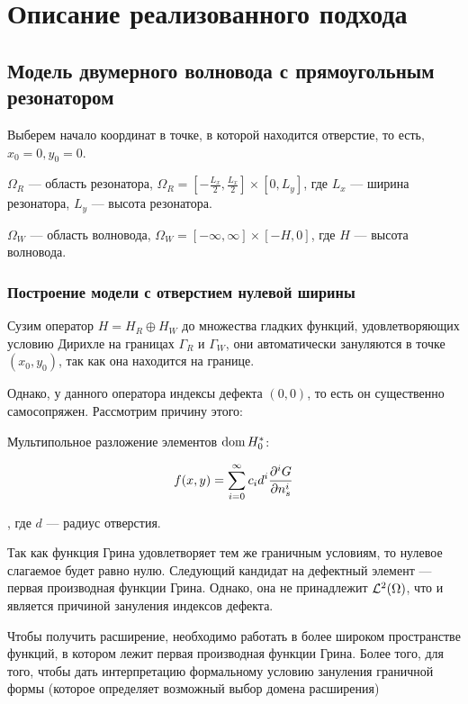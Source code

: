\chapter{Описание реализованного подхода}
\label{chapter2}

\section{Модель двумерного волновода с прямоугольным резонатором}


Выберем начало координат в точке, в которой находится отверстие, то есть, $x_0 = 0, y_0 = 0$.

$\Omega_R$ — область резонатора, $\Omega_R = [- \frac{L_x}{2}, \frac{L_x}{2}] \times [0, L_y]$, где $L_x$ — ширина резонатора, $L_y$ — высота резонатора.

$\Omega_W$ — область волновода, $\Omega_W = [-\infty, \infty] \times [-H, 0]$, где $H$ — высота волновода.

\subsection{Построение модели с отверстием нулевой ширины}
Сузим оператор $H = H_R \oplus H_W$ до множества гладких функций, удовлетворяющих условию Дирихле на границах $\Gamma_R$ и $\Gamma_W$, они автоматически зануляются в точке $(x_0, y_0)$, так как она находится на границе.

Однако, у данного оператора индексы дефекта $(0, 0)$, то есть он существенно самосопряжен. Рассмотрим причину этого:


Мультипольное разложение элементов $\operatorname{dom} H_0^*$:

\[
f(x, y) = \sum\limits_{i = 0}^\infty c_i d^i \pdv[i]{G}{n_s} (x, y, x_0, y_0; E_0)
\]

, где $d$ — радиус отверстия.

Так как функция Грина удовлетворяет тем же граничным условиям, то нулевое слагаемое будет равно нулю. Следующий кандидат на дефектный элемент — первая производная функции Грина. Однако, она не принадлежит $\mathcal{L}^2(\Omega)$, что и является причиной зануления индексов дефекта.

Чтобы получить расширение, необходимо работать в более широком пространстве функций, в котором лежит первая производная функции Грина. Более того, для того, чтобы дать интерпретацию формальному условию зануления граничной формы (которое определяет возможный выбор домена расширения)

